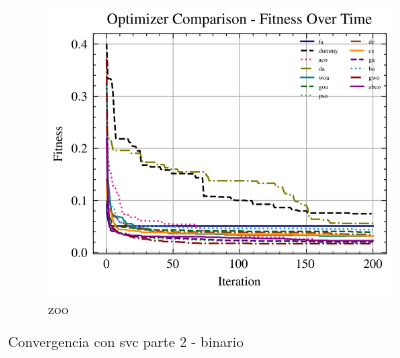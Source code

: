 \begin{figure}[htp]
    \begin{subfigure}[htp]{0.45\textwidth}
        \includegraphics[width=\textwidth]{imagenes/fitness_charts/img/binary/zoo/optimizers_fitness_svc.png}
        \caption{zoo}
        \label{fig:convergencia_zoo_svc}
    \end{subfigure}
    \caption{Convergencia con svc parte 2 - binario}
    \label{fig:convergencia_svc_2}
\end{figure}

